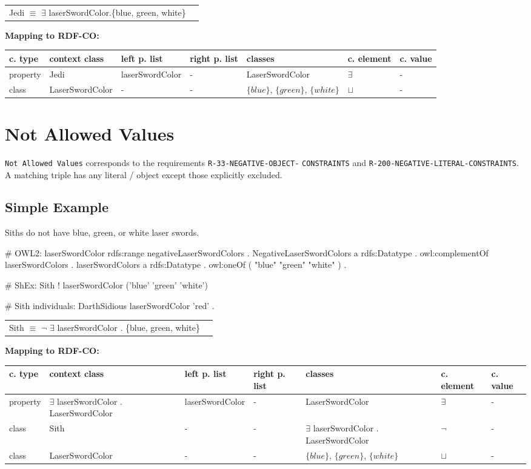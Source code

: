 \documentclass{llncs}
\newcommand{\ms}[1]{\texttt{#1}}
\newenvironment{gcotable}{
  \scriptsize
  \sffamily
  \vspace{0cm}
	\begin{center}
	\textbf{\vspace{0.4cm}Mapping to RDF-CO:} \\
  \begin{tabular}{l|l|l|l|l|l|l}
	\hline
  \textbf{c. type} & \textbf{context class} & \textbf{left p. list} & \textbf{right p. list} & \textbf{classes} & \textbf{c. element} & \textbf{c. value} \\
  \hline

}{
  \hline
  \end{tabular}
	\end{center}
}
\newenvironment{DL}{
  \vspace{0cm}
	\begin{center}
  \begin{tabular}{r l}

}{
  \end{tabular}
	\end{center}
}
\begin{document}
\begin{DL}
Jedi $\equiv$ $\exists$ laserSwordColor.\{blue, green, white\} \\
\end{DL}

\begin{gcotable}
property & Jedi & laserSwordColor & - & LaserSwordColor & $\exists$ & - \\
class & LaserSwordColor & - & - & $\{blue\}$, $\{green\}$, $\{white\}$ & $\sqcup$ & - \\
\end{gcotable}

\section{Not Allowed Values}

\ms{Not Allowed Values} corresponds to the requirements
\ms{R-33-NEGATIVE-OBJECT-} \ms{CONSTRAINTS} and
\ms{R-200-NEGATIVE-LITERAL-CONSTRAINTS}.
A matching triple has any literal / object except those explicitly excluded.

\subsection{Simple Example}

Siths do not have blue, green, or white laser swords.

\begin{ex}
# OWL2:
laserSwordColor rdfs:range negativeLaserSwordColors . 
NegativeLaserSwordColors
    a rdfs:Datatype .
    owl:complementOf laserSwordColors .
laserSwordColors
    a rdfs:Datatype .
    owl:oneOf ( "blue" "green" "white" ) .
\end{ex}

\begin{ex}
# ShEx:
Sith {
    ! laserSwordColor ('blue' 'green' 'white') }
\end{ex}

\begin{ex}
# Sith individuals:
DarthSidious
    laserSwordColor 'red' .
\end{ex}

\begin{DL}
Sith $\equiv$ $\neg$ $\exists$ laserSwordColor . \{blue, green, white\} \\
\end{DL}

\begin{gcotable}
property & $\exists$ laserSwordColor . LaserSwordColor & laserSwordColor & - & LaserSwordColor & $\exists$ & - \\
class & Sith & - & - & $\exists$ laserSwordColor . LaserSwordColor & $\neg$ & - \\
class & LaserSwordColor & - & - & $\{blue\}$, $\{green\}$, $\{white\}$ & $\sqcup$ & - \\
\end{gcotable}
\end{document}
